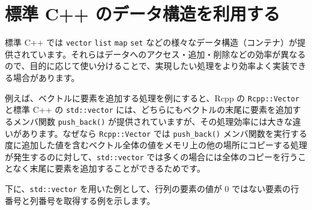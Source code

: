 \documentclass[]{book}
\begin{document}
\hypertarget{-c-}{%
\chapter{標準 C++ のデータ構造を利用する}\label{-c-}}

標準 C++ では \texttt{vector} \texttt{list} \texttt{map} \texttt{set} などの様々なデータ構造（コンテナ）が提供されています。それらはデータへのアクセス・追加・削除などの効率が異なるので、目的に応じて使い分けることで、実現したい処理をより効率よく実装できる場合があります。

例えば、ベクトルに要素を追加する処理を例にすると、Rcpp の \texttt{Rcpp::Vector} と標準 C++ の \texttt{std::vector} には、どちらにもベクトルの末尾に要素を追加するメンバ関数 \texttt{push\_back()} が提供されていますが、その処理効率には大きな違いがあります。なぜなら \texttt{Rcpp::Vector} では \texttt{push\_back()} メンバ関数を実行する度に追加した値を含むベクトル全体の値をメモリ上の他の場所にコピーする処理が発生するのに対して、\texttt{std::vector} では多くの場合には全体のコピーを行うことなく末尾に要素を追加することができるためです。

下に、\texttt{std::vector} を用いた例として、行列の要素の値が 0 ではない要素の行番号と列番号を取得する例を示します。
\end{document}
